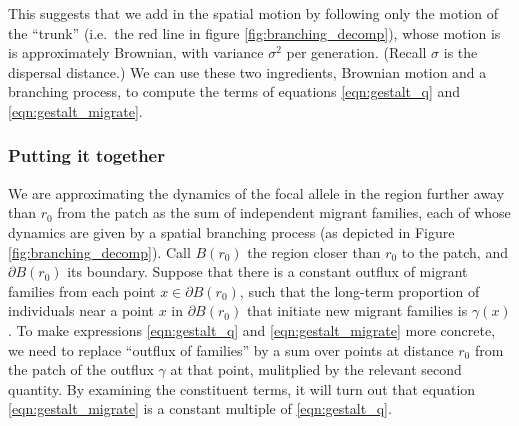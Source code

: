 \documentclass{article}
\begin{document}
This suggests that we add in the spatial motion by following only the motion of the ``trunk''
(i.e.\ the red line in figure \ref{fig:branching_decomp}),
whose motion is is approximately Brownian, with variance $\sigma^2$ per generation.
(Recall $\sigma$ is the dispersal distance.)
We can use these two ingredients, Brownian motion and a branching process, 
to compute the terms of equations \eqref{eqn:gestalt_q} and \eqref{eqn:gestalt_migrate}.


\subsubsection*{Putting it together}

We are approximating the dynamics of the focal allele in the region further away than $r_0$ from the patch
as the sum of independent migrant families, each of whose dynamics are
given by a spatial branching process (as depicted in Figure \ref{fig:branching_decomp}).
Call $B(r_0)$ the region closer than $r_0$ to the patch, and $\partial B(r_0)$ its boundary.
Suppose that there is a constant outflux of migrant families from each point $x \in \partial B(r_0)$,
such that the long-term proportion of individuals near a point $x$ in $\partial B(r_0)$ that initiate new migrant families
is $\gamma(x)$.
To make expressions \eqref{eqn:gestalt_q} and \eqref{eqn:gestalt_migrate} more concrete,
we need to replace ``outflux of families'' by a sum over points at distance $r_0$ from the patch
of the outflux $\gamma$ at that point, mulitplied by the relevant second quantity.
By examining the constituent terms,
it will turn out that equation \eqref{eqn:gestalt_migrate} is a constant multiple of \eqref{eqn:gestalt_q}.
\end{document}
